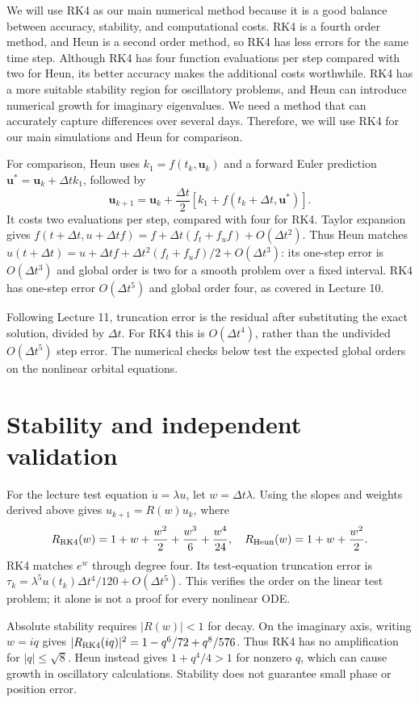 \documentclass[11pt]{article}
\newcommand{\dt}{\Delta t}
\newcommand{\vect}[1]{\boldsymbol{#1}}
\begin{document}
We will use RK4 as our main numerical method because it is a good balance between accuracy, stability, and computational costs. RK4 is a fourth order method, and Heun is a second order method, so RK4 has less errors for the same time step. Although RK4 has four function evaluations per step compared with two for Heun, its better accuracy makes the additional costs worthwhile. RK4 has a more suitable stability region for oscillatory problems, and Heun can introduce numerical growth for imaginary eigenvalues. We need a method that can accurately capture differences over several days. Therefore, we will use RK4 for our main simulations and Heun for comparison.

For comparison, Heun uses $k_1=f(t_k,\vect u_k)$ and a forward Euler prediction $\vect u^*=\vect u_k+\dt k_1$, followed by
\[
\vect u_{k+1}=\vect u_k+\frac{\dt}{2}[k_1+f(t_k+\dt,\vect u^*)].
\]
It costs two evaluations per step, compared with four for RK4. Taylor expansion gives
$f(t+\dt,u+\dt f)=f+\dt(f_t+f_u f)+O(\dt^2)$.
Thus Heun matches $u(t+\dt)=u+\dt f+\dt^2(f_t+f_u f)/2+O(\dt^3)$: its one-step error is $O(\dt^3)$ and global order is two for a smooth problem over a fixed interval. RK4 has one-step error $O(\dt^5)$ and global order four, as covered in Lecture 10.

Following Lecture 11, truncation error is the residual after substituting the exact solution, divided by $\dt$. For RK4 this is $O(\dt^4)$, rather than the undivided $O(\dt^5)$ step error. The numerical checks below test the expected global orders on the nonlinear orbital equations.

\section{Stability and independent validation}
For the lecture test equation $\dot u=\lambda u$, let $w=\dt\lambda$.
Using the slopes and weights derived above gives $u_{k+1}=R(w)u_k$, where
\[
R_{\rm RK4}(w)=1+w+\frac{w^2}{2}+\frac{w^3}{6}+\frac{w^4}{24},
\quad R_{\rm Heun}(w)=1+w+\frac{w^2}{2}.
\]
RK4 matches $e^w$ through degree four. Its test-equation truncation error is
$\tau_k=\lambda^5u(t_k)\dt^4/120+O(\dt^5)$. This verifies the order on the linear test problem; it alone is not a proof for every nonlinear ODE.

Absolute stability requires $|R(w)|<1$ for decay. On the imaginary axis, writing $w=iq$ gives $|R_{\rm RK4}(iq)|^2=1-q^6/72+q^8/576$. Thus RK4 has no amplification for $|q|\le\sqrt8$. Heun instead gives $1+q^4/4>1$ for nonzero $q$, which can cause growth in oscillatory calculations. Stability does not guarantee small phase or position error.
\end{document}
